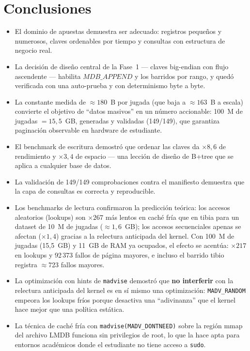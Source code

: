 \documentclass[12pt, letterpaper]{article}
\begin{document}
\section{Conclusiones}

\begin{itemize}
    \item El dominio de apuestas demuestra ser adecuado: registros pequeños
    y numerosos, claves ordenables por tiempo y consultas con estructura de
    negocio real.
    \item La decisión de diseño central de la Fase~1 --- claves big-endian
    con flujo ascendente --- habilita $MDB\_APPEND$ y los barridos por rango,
    y quedó verificada con una auto-prueba y con determinismo byte a byte.
    \item La constante medida de $\approx 180$~B por jugada (que baja a
    $\approx 163$~B a escala) convierte el objetivo de ``datos masivos'' en
    un número accionable: 100~M de jugadas $= 15{,}5$~GB, generadas y
    validadas (149/149), que garantiza paginación observable en hardware de
    estudiante.
    \item El benchmark de escritura demostró que ordenar las claves da
    $\times 8{,}6$ de rendimiento y $\times 3{,}4$ de espacio --- una
    lección de diseño de B+tree que se aplica a cualquier base de datos.
    \item La validación de 149/149 comprobaciones contra el manifiesto
    demuestra que la capa de consultas es correcta y reproducible.
    \item Los benchmarks de lectura confirmaron la predicción teórica: los
    accesos aleatorios (lookups) son $\times 267$ más lentos en caché fría
    que en tibia para un dataset de 10~M de jugadas ($\approx 1{,}6$~GB); los
    accesos secuenciales apenas se afectan ($\times 1{,}4$) gracias a la
    relectura anticipada del kernel. Con 100~M de jugadas (15{,}5~GB) y 11~GB
    de RAM ya ocupados, el efecto se acentúa: $\times 217$ en lookups y
    92\,373 fallos de página mayores, e incluso el barrido tibio registra
    $\approx$723 fallos mayores.
    \item La optimización con hints de \texttt{madvise} demostró que
    \textbf{no interferir} con la relectura anticipada del kernel es en sí
    mismo una optimización: \texttt{MADV\_RANDOM} empeora los lookups fríos
    porque desactiva una ``adivinanza'' que el kernel hace mejor que una
    política estática.
    \item La técnica de caché fría con \texttt{madvise(MADV\_DONTNEED)}
    sobre la región mmap del archivo LMDB funciona sin privilegios de root,
    lo que la hace apta para entornos académicos donde el estudiante no
    tiene acceso a \texttt{sudo}.
\end{itemize}
\end{document}
